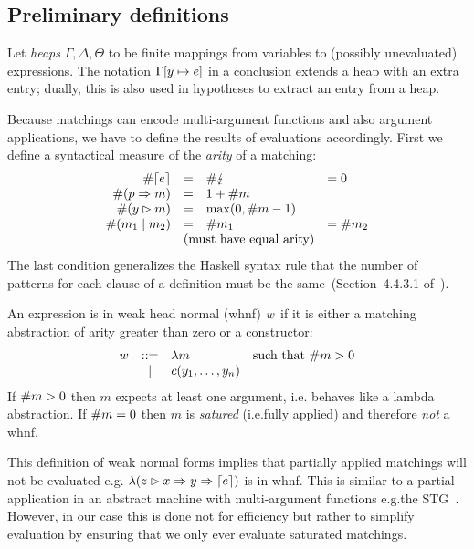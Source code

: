 \subsection{Preliminary definitions}

Let \emph{heaps} $\Gamma, \Delta, \Theta$ to be finite mappings from
variables to (possibly unevaluated) expressions.  The notation
$\Gamma[y \mapsto e]$ in a conclusion extends a heap with an extra
entry; dually, this is also used in hypotheses to extract an entry
from a heap.

Because matchings can encode multi-argument functions and also
argument applications, we have to define the results of evaluations
accordingly. First we define a syntactical measure  of the \emph{arity}
of a matching:
\[
  \begin{array}{rcll}
    \arity{\matchreturn{e}} &=&  \arity{\matchfail} &= 0\\
    \arity{(\matchpat{p}{m})} &=& 1 + \arity{m} \\
    \arity{(\matcharg{y}{m})} &=& \max(0, \arity{m} - 1) \\
     \arity{(\matchalt{m_1}{m_2})} &=& \arity{m_1} &= \arity{m_2} \\
                            & \multicolumn{2}{l}{\text{(must have equal arity)}}
  \end{array}
\]
The last condition generalizes the Haskell syntax rule that the number
of patterns for each clause of a definition must be the
same~(Section~4.4.3.1 of~\cite{haskell_2010_report}).

An expression is in weak head normal (whnf) $w$ if it is either
a matching abstraction of arity greater than zero or a constructor:
\[
\begin{array}{rcll}
  w  &::=&  \lambda m & \text{such that}~ \#{m}> 0 \\
     &|& c(y_1,\ldots,y_n)
\end{array}
\]
If $\#{m}>0$ then $m$ expects at least one argument, i.e.\@
behaves like a lambda abstraction.  If $\#{m}= 0$ then $m$ is
\emph{satured} (i.e.\@ fully applied) and therefore \emph{not} a whnf.

This definition of weak normal forms implies that partially applied
matchings will not be evaluated e.g.\@
$\lambda(z\rhd x \Rightarrow y \Rightarrow \left\lceil e\right\rceil)$
is in whnf. This is similar to a partial application in an abstract
machine with multi-argument functions e.g.\@ the
STG~\cite{jones_1992}.  However, in our case this is done not for
efficiency but rather to simplify evaluation by ensuring that we only
ever evaluate saturated matchings.

